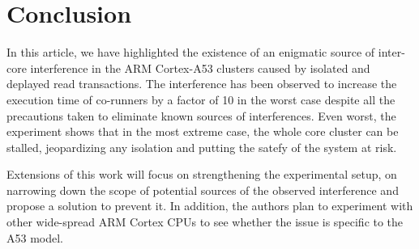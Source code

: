 \section{Conclusion}
    In this article, we have highlighted the existence of an enigmatic source of inter-core interference in the ARM Cortex-A53 clusters caused by isolated and deplayed read transactions.
    The interference has been observed to increase the execution time of co-runners by a factor of 10 in the worst case despite all the precautions taken to eliminate known sources of interferences.
    Even worst, the experiment shows that in the most extreme case, the whole core cluster can be stalled, jeopardizing any isolation and putting the satefy of the system at risk.

    Extensions of this work will focus on strengthening the experimental setup, on narrowing down the scope of potential sources of the observed interference and propose a solution to prevent it. In addition, the authors plan to experiment with other wide-spread ARM Cortex CPUs to see whether the issue is specific to the A53 model.

